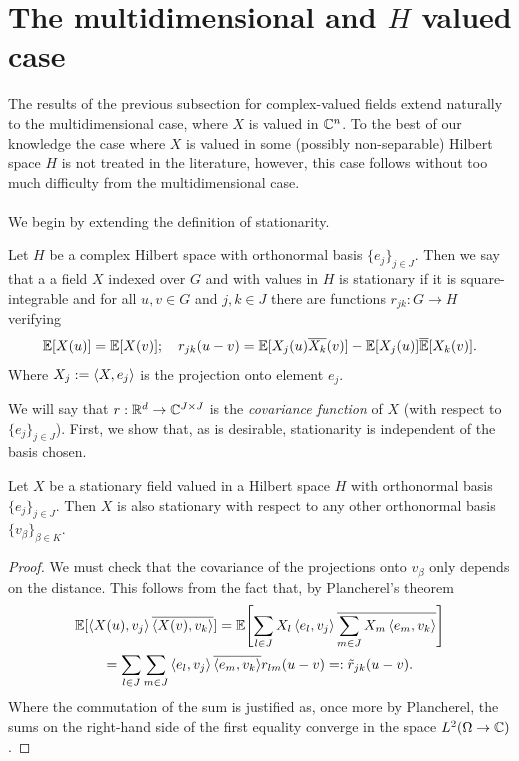 \documentclass[
    a4paper,
    DIV=14,
    abstract=true,
    numbers=noenddot
]{scrartcl}
\begin{document}
\section{The multidimensional and $H$ valued case}
The results of the previous subsection for complex-valued fields extend naturally to the multidimensional case, where $X$ is valued in $\mathbb{C}^n$. To the best of our knowledge the case where $X$ is valued in some (possibly non-separable) Hilbert space $H$ is not treated in the literature, however, this case follows without too much difficulty from the multidimensional case. \\
\\
We begin by extending the definition of  stationarity.

\begin{definition}
	Let $H$ be a complex Hilbert space with orthonormal basis $\{e_j\}_{j\in J}$. Then we say that a a field $X$  indexed over $G$ and with values in $H$ is stationary if it is square-integrable and for all $u,v \in G$ and $j, k\in J$ there are functions $r_{jk}: G\to H$ verifying
	\begin{equation*}
		\mathbb{E}[X(u)]=\mathbb{E}[X(v)];\quad r_{jk}(u-v)=\mathbb{E}[{X_{j}(u)\overline{X_k}(v)}]-\mathbb{E}[{X_{j}(u)]\overline{\mathbb{E}}[{X_k}(v)}].
	\end{equation*}
	Where $X_j:=\left\langle X,e_j\right\rangle$ is the projection onto element $e_j$.
\end{definition}
We will say that $r:\mathbb{R}^d\to\mathbb{C}^{J\times J}$ is the \emph{covariance function} of $X$ (with respect to $\{e_j\}_{j\in J}$). First, we show that, as is desirable, stationarity is independent of the basis chosen.
\begin{lemma}
	Let $X$ be a stationary field valued in a Hilbert space $H$ with orthonormal basis $\{e_j\}_{j\in J}$. Then $X$ is also stationary with respect to any other orthonormal basis $\{v_\beta\}_{\beta\in K}$.
\end{lemma}
\begin{proof}
	We must check that the covariance of the projections onto $v_\beta$ only depends on the distance. This follows from the fact that, by Plancherel's theorem
	\begin{multline*}
		\mathbb{E}[\left\langle X(u),v_j\right\rangle\overline{\left\langle X(v),v_k\right\rangle}]=\mathbb{E}\qty[\sum_{l \in  J}X_l\left\langle e_l,v_j\right\rangle\overline{\sum_{m\in J}X_m \left\langle e_m,v_k\right\rangle }]\\= \sum_{l \in  J}\sum_{m \in  J} \left\langle e_l,v_j\right\rangle \overline{\left\langle e_m,v_k\right\rangle}r_{l m}(u-v)=:\tilde{r}_{ j k }(u-v) .
	\end{multline*}
	Where the commutation of the sum is justified  as, once more by Plancherel, the sums on the right-hand side of the first equality  converge in the space $L^2(\Omega\to\mathbb{C})$.
\end{proof}
\end{document}
